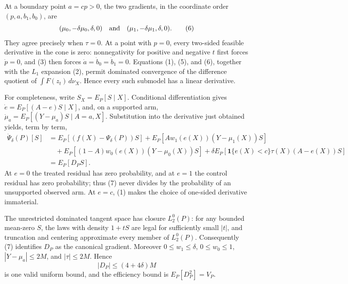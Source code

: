 At a boundary point \(a=cp>0\), the two gradients, in the coordinate order \((p,a,b_1,b_0)\), are
\begin{equation}
 (\mu _0,-\delta\mu _0,\delta,0)\quad\hbox{and}\quad
 (\mu _1,-\delta\mu _1,\delta,0).                                                       \tag{6}
\end{equation}
They agree precisely when \(\tau=0\).  At a point with \(p=0\), every two-sided feasible derivative in the cone is zero: nonnegativity for positive and negative \(t\) first forces \(\dot p=0\), and (3) then forces \(\dot a=\dot b_0=\dot b_1=0\).  Equations (1), (5), and (6), together with the \(L_1\) expansion (2), permit dominated convergence of the difference quotient of \(\int F(z_t)\,d\nu_X\).  Hence every such submodel has a linear derivative.

For completeness, write \(S_X=E_P[S\mid X]\).  Conditional differentiation gives
\(\dot e=E_P[(A-e)S\mid X]\), and, on a supported arm,
\(\dot\mu_a=E_P[(Y-\mu_a)S\mid A=a,X]\).  Substitution into the derivative just obtained yields, term by term,
\begin{equation}
\begin{aligned}
 \dot\Psi_\delta(P)[S]
 &=E_P[(f(X)-\Psi_\delta(P))S]
   +E_P\!\left[Aw_1(e(X))(Y-\mu _1(X))S\right]\\
 &\quad+E_P\!\left[(1-A)w_0(e(X))(Y-\mu _0(X))S\right]
   +\delta E_P\!\left[\mathbf1\{e(X)<c\}\tau(X)(A-e(X))S\right]\\
 &=E_P[D_P S].
\end{aligned}                                                                             \tag{7}
\end{equation}
At \(e=0\) the treated residual has zero probability, and at \(e=1\) the control residual has zero probability; thus (7) never divides by the probability of an unsupported observed arm.  At \(e=c\), (1) makes the choice of one-sided derivative immaterial.

The unrestricted dominated tangent space has closure \(L_2^0(P)\): for any bounded mean-zero \(S\), the laws with density \(1+tS\) are legal for sufficiently small \(|t|\), and truncation and centering approximate every member of \(L_2^0(P)\).  Consequently (7) identifies \(D_P\) as the canonical gradient.  Moreover \(0\le w_1\le\delta\), \(0\le w_0\le1\), \(|Y-\mu_a|\le2M\), and \(|\tau|\le2M\).  Hence
\begin{equation}
 |D_P|\le (4+4\delta)M                                                                    \tag{8}
\end{equation}
is one valid uniform bound, and the efficiency bound is \(E_P[D_P^2]=V_P\).

